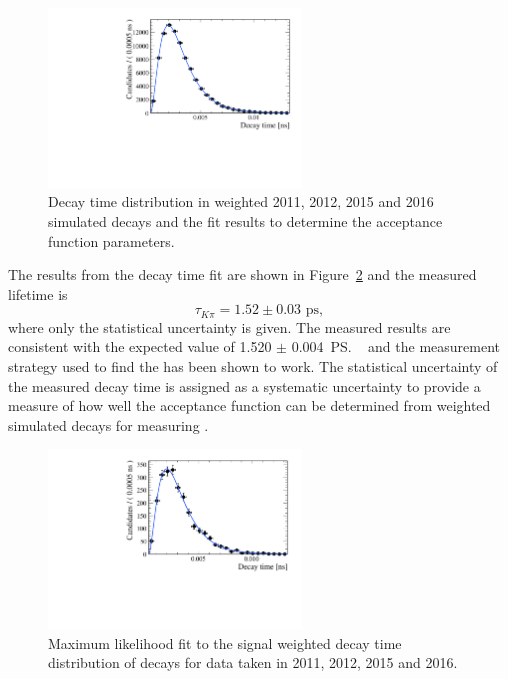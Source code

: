 \begin{figure}[tbp]
\centering
  \includegraphics[width=0.6\textwidth]{./Figs/LifetimeSystematics/Bd2KPi_acceptance_fit.pdf}
\caption{Decay time distribution in weighted 2011, 2012, 2015 and 2016 simulated decays and the \ml fit results to determine the acceptance function parameters. }
\label{fig:bdkpiacceptancefit}
\end{figure}

The results from the decay time fit are shown in Figure~\ref{fig:bdkpilifetimefit} and the measured \bdkpi lifetime is                 
\begin{equation}
\tau_{K\pi} = 1.52 \pm 0.03  \text{ ps},
\end{equation}
where only the statistical uncertainty is given. %
 The measured results are consistent with the expected value of 1.520 $\pm$ 0.004~\ps~\cite{Olive:2016xmw} and the measurement strategy used to find the \bsmumu \el has been shown to work. The statistical uncertainty of the measured \bdkpi decay time is assigned as a systematic uncertainty to provide a measure of how well the acceptance function can be determined from weighted simulated decays for measuring \tmumu. 

\begin{figure}[tbp]
\centering
  \includegraphics[width=0.6\textwidth]{./Figs/LifetimeSystematics/Bd2KPi_lifetime_fit.pdf}
\caption{Maximum likelihood fit to the signal weighted decay time distribution of \bdkpi decays for data taken in 2011, 2012, 2015 and 2016. }
\label{fig:bdkpilifetimefit}
\end{figure}

